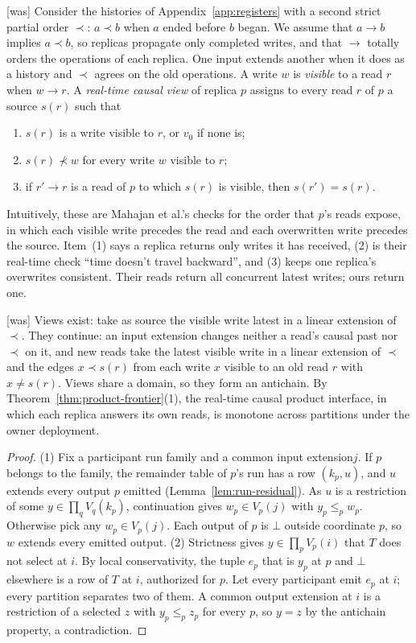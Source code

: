 \documentclass[sigconf]{cidr-2027}
\theoremstyle{remark}
\newcommand{\inrel}{extends\xspace}          %
\newcommand{\indesc}{input extension\xspace} %
\newcommand{\outrel}{extends\xspace}          %
\newcommand{\outnoun}{output extension\xspace}%
\begin{document}
{\footnotesize\color{black!50}\noindent\textsf{[was]} Consider the histories of Appendix~\ref{app:registers} with a second strict
partial order $\prec$: $a\prec b$ when $a$ ended before $b$ began.  We assume
that $a\to b$ implies $a\prec b$, so replicas propagate only completed writes,
and that $\to$ totally orders the operations of each replica.  One input
\inrel another when it does as a history and $\prec$ agrees on the old
operations.  A write $w$ is \emph{visible} to a read $r$ when $w\to r$.  A
\emph{real-time causal view} of replica $p$ assigns to every read $r$ of $p$ a
source $s(r)$ such that
\begin{enumerate}
  \item $s(r)$ is a write visible to $r$, or $v_0$ if none is;
  \item $s(r)\not\prec w$ for every write $w$ visible to $r$;
  \item if $r'\to r$ is a read of $p$ to which $s(r)$ is visible, then
        $s(r')=s(r)$.
\end{enumerate}
Intuitively, these are Mahajan et al.'s checks for the order that $p$'s reads expose, in
which each visible write precedes the read and each overwritten write
precedes the source.  Item~(1) says a replica returns only writes it has
received, (2) is their real-time check ``time doesn't travel backward'', and
(3) keeps one replica's overwrites consistent.  Their reads return all
concurrent latest writes; ours return one.\par}



{\footnotesize\color{black!50}\noindent\textsf{[was]} Views exist: take as source the visible write latest in a linear extension of
$\prec$.  They continue: an \indesc changes neither a read's causal past nor
$\prec$ on it, and new reads take the latest visible write in a linear
extension of $\prec$ and the edges $x\prec s(r)$ from each write $x$ visible to
an old read $r$ with $x\ne s(r)$.  Views share a domain, so they form an
antichain.  By Theorem~\ref{thm:product-frontier}(1), the real-time causal
product interface, in which each replica answers its own reads, is monotone
across partitions under the owner deployment.\par}

\color{blue!70!black}\begin{proof}
(1) Fix a participant run family and a common \indesc $j$.  If $p$ belongs to
the family, the remainder table of $p$'s run has a row $(k_p,u)$, and $u$ \outrel every output $p$ emitted
(Lemma~\ref{lem:run-residual}).  As $u$ is a restriction of some
$y\in\prod_qV_q(k_p)$, continuation gives $w_p\in V_p(j)$ with $y_p\le_p w_p$.
Otherwise pick any $w_p\in V_p(j)$.  Each output of $p$ is $\bot$ outside
coordinate $p$, so $w$ \outrel every emitted output.
(2) Strictness gives $y\in\prod_pV_p(i)$ that $T$ does not select at $i$.  By
local conservativity, the tuple $e_p$ that is $y_p$ at $p$ and $\bot$
elsewhere is a row of $T$ at $i$, authorized for $p$.  Let every participant
emit $e_p$ at $i$; every partition separates two of them.  A common \outnoun
at $i$ is a restriction of a selected $z$ with $y_p\le_p z_p$ for every $p$, so
$y=z$ by the antichain property, a contradiction.\color{black}
\end{proof}
\end{document}

